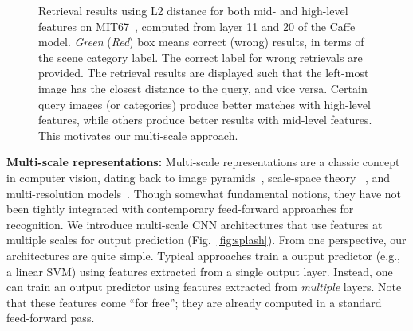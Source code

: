 \documentclass[10pt,twocolumn,letterpaper]{article}
\begin{document}
\begin{figure}
\centering
\caption{Retrieval results using L2 distance for both mid- and high-level features on MIT67~\cite{MIT67}, computed from layer 11 and 20 of the Caffe model. \textit{Green} (\textit{Red}) box means correct (wrong) results, in terms of the scene category label. The correct label for wrong retrievals are provided. The retrieval results are displayed such that the left-most image has the closest distance to the query, and vice versa. Certain query images (or categories) produce better matches with high-level features, while others produce better results with mid-level features. This motivates our multi-scale approach.}
\label{fig:moti}
\end{figure}


{\bf Multi-scale representations:}  Multi-scale representations are a classic concept in computer vision, dating back to image pyramids~\cite{burt1983laplacian}, scale-space theory ~\cite{lindeberg1993scale}, and multi-resolution models~\cite{mallat1999wavelet}. Though somewhat fundamental notions, they have not been tightly integrated with contemporary feed-forward approaches for recognition. We introduce multi-scale CNN architectures that use features at multiple scales for output prediction (Fig.~\ref{fig:splash}). From one perspective, our architectures are quite simple. Typical approaches train a output predictor (e.g., a linear SVM) using features extracted from a single output layer. Instead, one can train an output predictor using features extracted from {\em multiple} layers. Note that these features come ``for free''; they are already computed in a standard feed-forward pass.
\end{document}
